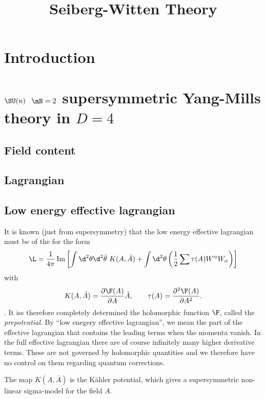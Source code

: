 \documentclass{worksheetclass}
\title{Seiberg-Witten Theory}
\begin{document}
\maketitle

\tableofcontents

\section{Introduction}



\section{$\SU(n)$ $\mN=2$ supersymmetric Yang-Mills theory in $D=4$}

    \subsection{Field content}

    \subsection{Lagrangian}

    \subsection{Low energy effective lagrangian}

        It is known (just from supersymmetry) that the low energy effective lagrangian must be of the for the form
        \begin{equation}
            \L = \frac{1}{4\pi}\Im\left[\int\d^2\theta\d^2\bar{\theta}~K(A,\bar{A})+\int\d^2\theta\left(\frac{1}{2}\sum\tau(A)W^\alpha W_\alpha\right)\right]
        \end{equation}
        with
        \begin{equation}
            K(A,\bar{A})=\pdv{\F(A)}{A}\bar{A},\qquad \tau(A)=\pdv[2]{\F(A)}{A}.
        \end{equation}
        . It iss therefore completely determined the holomorphic function $\F$, called the \emph{prepotential}. By ``low enegery effective lagrangian'', we mean the part of the effective lagrangian that contains the leading terms when the momenta vanish. In the full effective lagrangian there are of course infinitely many higher derivative terms. These are not governed by holomorphic quantities and we therefore have no control on them regarding quantum corrections.

        The map $K(A,\bar{A})$ is the Kähler potential, which gives a supersymmetric non-linear sigma-model for the field $A$.



\printbibliography
\end{document}
